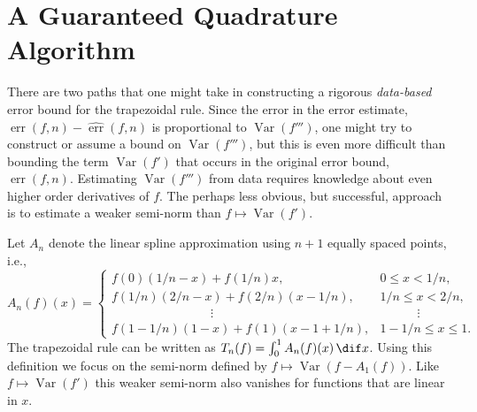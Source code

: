 \documentclass[]{amsart}
\DeclareMathOperator{\Var}{Var}
\DeclareMathOperator{\err}{err}
\newcommand{\herr}{\widehat{\err}}
\theoremstyle{definition}
\theoremstyle{remark}
\begin{document}
\section{A Guaranteed Quadrature Algorithm} \label{newalgosec}

There are two paths that one might take in constructing a rigorous \emph{data-based} error bound for the trapezoidal rule.  Since the error in the error estimate, $\err(f,n)-\herr(f,n)$ is proportional to $\Var(f''')$, one might try to construct or assume a bound on $\Var(f''')$, but this is even more difficult than bounding the term $\Var(f')$ that occurs in the original error bound, $\err(f,n)$. Estimating $\Var(f''')$ from data requires knowledge about even higher order derivatives of $f$.  The perhaps less obvious, but successful, approach is to estimate a weaker semi-norm than $f \mapsto \Var(f')$.  

Let $A_n$ denote the linear spline approximation using $n+1$ equally spaced points, i.e., 
\begin{equation}
\label{Andef}
A_n(f)(x) = \begin{cases} f(0)(1/n-x) + f(1/n)x, & 0 \le x < 1/n, \\
f(1/n)(2/n-x) + f(2/n)(x-1/n), & 1/n \le x < 2/n, \\
\qquad \qquad \qquad \qquad \vdots & \qquad \quad \vdots \\
f(1-1/n)(1-x) + f(1)(x-1 + 1/n), & 1-1/n \le x \le 1.
\end{cases}
\end{equation}   
The trapezoidal rule can be written as $T_n(f) = \int_0^1 A_n(f)(x) \, \dif x$.  Using this definition we focus on the semi-norm defined by $f \mapsto \Var(f-A_1(f))$.  Like $f \mapsto \Var(f')$ this weaker semi-norm also vanishes for functions that are linear in $x$.
\end{document}
